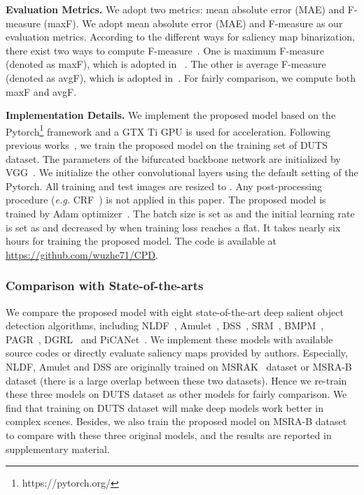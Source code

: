 \documentclass[10pt,twocolumn,letterpaper]{article}
\begin{document}
\noindent\textbf{Evaluation Metrics. } We adopt two metrics: mean absolute error (MAE) and F-measure (maxF). We adopt mean absolute error (MAE) and F-measure as our evaluation metrics. According to the different ways for saliency map binarization, there exist two ways to compute F-measure~\cite{2015SalObjBenchmark}. One is maximum F-measure (denoted as maxF), which is adopted in ~\cite{2018DSS,2018PiCANet,2017NLDF,2018BMPM}. The other is average F-measure (denoted as avgF), which is adopted in~\cite{2017SRM,2018DGRL,2017Amulet,2018PAGR}. For fairly comparison, we compute both maxF and avgF.





\noindent \textbf{Implementation Details.} We implement the proposed model based on the Pytorch\footnote{https://pytorch.org/} framework and a GTX Ti GPU is used for acceleration. Following previous works~\cite{2018PiCANet,2017SRM,2018DGRL,2018BMPM,2018PAGR}, we train the proposed model on the training set of DUTS~\cite{Dataset-DUTS} dataset. The parameters of the bifurcated backbone network are initialized by VGG~\cite{2014VGG}. We initialize the other convolutional layers using the default setting of the Pytorch. All training and test images are resized to . Any post-processing procedure (\emph{e.g.} CRF~\cite{2011CRF}) is not applied in this paper. The proposed model is trained by Adam optimizer~\cite{2014Adam}. The batch size is set as  and the initial learning rate is set as  and decreased by  when training loss reaches a flat. It takes nearly six hours for training the proposed model. The code is available at \url{https://github.com/wuzhe71/CPD}.

\subsubsection{Comparison with State-of-the-arts}
We compare the proposed model with eight state-of-the-art deep salient object detection algorithms, including NLDF~\cite{2017NLDF}, Amulet~\cite{2017Amulet}, DSS~\cite{2018DSS}, SRM~\cite{2017SRM}, BMPM~\cite{2018BMPM}, PAGR~\cite{2018PAGR}, DGRL~\cite{2018DGRL} and PiCANet~\cite{2018PiCANet}. We implement these models with available source codes or directly evaluate saliency maps provided by authors. Especially, NLDF, Amulet and DSS are originally trained on MSRAK~\cite{2015GlobalContrast} dataset or MSRA-B~\cite{Dataset-MSRA-B} dataset (there is a large overlap between these two datasets). Hence we re-train these three models on DUTS dataset as other models for fairly comparison. We find that training on DUTS dataset will make deep models work better in complex scenes. Besides, we also train the proposed model on MSRA-B dataset to compare with these three original models, and the results are reported in supplementary material.
\end{document}
